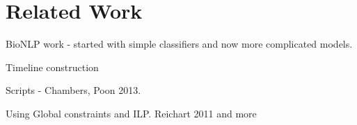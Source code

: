 \section{Related Work}

BioNLP work - started with simple classifiers and now more complicated models.

Timeline construction

Scripts - Chambers, Poon 2013.

Using Global constraints and ILP. Reichart 2011 and more

 
